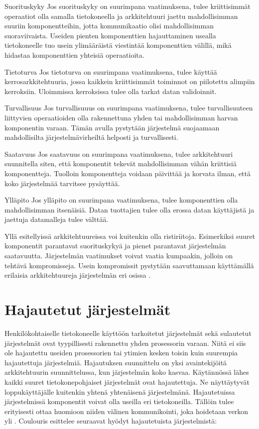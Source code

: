 \documentclass[utf8]{gradu3}
\begin{document}
\begin{desclist}
\item[Suorituskyky] Jos suorituskyky on suurimpana vaatimuksena, tulee kriittisimmät operaatiot olla samalla tietokoneella ja arkkitehtuuri jaettu mahdollisimman suuriin komponentteihin, jotta kommunikaatio olisi mahdollisimman suoraviivaista. Useiden pienten komponenttien hajauttaminen usealla tietokoneelle tuo usein ylimääräistä viestintää komponenttien välillä, mikä hidastaa komponenttien yhteisiä operaatioita. 
\item[Tietoturva] Jos tietoturva on suurimpana vaatimuksena, tulee käyttää kerrosarkkitehtuuria, jossa kaikkein kriittisimmät toiminnot on piilotettu alimpiin kerroksiin. Uloimmissa kerroksissa tulee olla tarkat datan validoinnit. 
\item[Turvallisuus] Jos turvallisuuus on suurimpana vaatimuksena, tulee turvallisuuteen liittyvien operaatioiden olla rakennettuna yhden tai mahdollisimman harvan komponentin varaan. Tämän avulla pystytään järjestelmä suojaamaan mahdollisilta järjestelmävirheiltä helposti ja turvallisesti.
\item[Saatavuus] Jos saatavuus on suurimpana vaatimuksena, tulee arkkitehtuuri suunnitella siten, että komponentit tekevät mahdollisimman vähän kriittisiä komponentteja. Tuolloin komponentteja voidaan päivittää ja korvata ilman, että koko järjestelmää tarvitsee pysäyttää. 
\item[Ylläpito] Jos ylläpito on suurimpana vaatimuksena, tulee komponenttien olla mahdollisimman itsenäisiä. Datan tuottajien tulee olla erossa datan käyttäjistä ja jaettuja datamalleja tulee välttää.
\end{desclist}

Yllä esitellyissä arkkitehtuureissa voi kuitenkin olla ristiriitoja. Esimerkiksi suuret komponentit parantavat suorituskykyä ja pienet parantavat järjestelmän saatavuutta. Järjestelmän vaatimukset voivat vaatia kumpaakin, jolloin on tehtävä kompromisseja. Usein kompromissit pystytään saavuttamaan käyttämällä erilaisia arkkitehtuureja järjestelmän eri osissa \parencite[s.152]{Sommerville}. 


\pagebreak

\section{Hajautetut järjestelmät}
Henkilökohtaiselle tietokoneelle käyttöön tarkoitetut järjestelmät sekä sulautetut järjestelmät ovat tyypillisesti rakennettu yhden prosessorin varaan. Niitä ei siis ole hajautettu useiden prosessorien tai ytimien kesken toisin kuin suurempia hajautettuja järjestelmiä. Hajautuksen suunnittelu on yksi avaintekijöitä arkkitehtuurin suunnittelussa, kun järjestelmän koko kasvaa. Käytännössä lähes kaikki suuret tietokonepohjaiset järjestelmät ovat hajautettuja. Ne näyttäytyvät loppukäyttäjälle kuitenkin yhtenä yhtenäisenä järjestelmänä. Hajautetuissa järjestelmissä komponentit voivat olla useilla eri tietokoneilla. Tällöin tulee erityisesti ottaa huomioon niiden välinen kommunikointi, joka hoidetaan verkon yli \parencite[s. 480]{Sommerville}. Coulouris \parencite{Coulouris} esittelee seuraavat hyödyt hajautetuista järjestelmistä:
\end{document}
